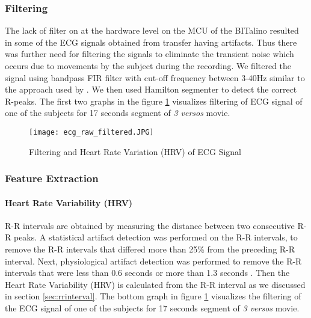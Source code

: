 \subsubsection{Filtering} The lack of filter on at the hardware level on the MCU \cite{noauthor_faq_nodate} of the BITalino resulted in some of the ECG signals obtained from transfer having artifacts. Thus there was further need for filtering the signals to eliminate the transient noise which occurs due to movements by the subject during the recording. We filtered the signal using bandpass FIR filter with cut-off frequency between 3-40Hz similar to the approach used by \citeauthor{canento_review_nodate} \cite{canento_review_nodate}. We then used Hamilton segmenter \cite{hamilton_open_2002} to detect the correct R-peaks. The first two graphs in the figure \ref{fig:ecg_filtering} visualizes filtering of ECG signal of one of the subjects for 17 seconds segment of \textit{3 versos} movie.

\begin{figure}
    \centering
    \texttt{[image: ecg\_raw\_filtered.JPG]}
    \caption{Filtering and Heart Rate Variation (HRV) of ECG Signal}
    \label{fig:ecg_filtering}
\end{figure}

\subsubsection{Feature Extraction} 

\paragraph{Heart Rate Variability (HRV)} R-R intervals are obtained by measuring the distance between two consecutive R-R peaks. A statistical artifact detection was performed on the R-R intervals, to remove the R-R intervals that differed more than 25\% from the preceding R-R interval. Next, physiological artifact detection was performed to remove the R-R intervals that were less than 0.6 seconds or more than 1.3 seconds \cite{noauthor_normal_2018}. Then the Heart Rate Variability (HRV) is calculated from the R-R interval as we discussed in section \ref{sec:rrinterval}. The bottom graph in figure \ref{fig:ecg_filtering} visualizes the filtering of the ECG signal of one of the subjects for 17 seconds segment of \textit{3 versos} movie.

